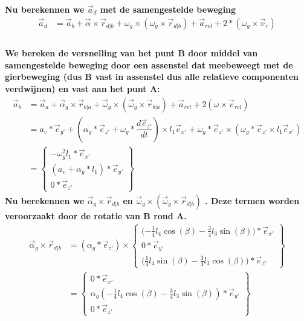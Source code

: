 \documentclass[a4paper,10pt]{article}
\begin{document}
\textbf{Nu berekennen we $\vec{a}_d$ met de samengestelde beweging}\\
\begin{equation}
	\begin{aligned}
		\vec{a}_d &= \vec{a}_b + \vec{\alpha} \times  \vec{r}_{d|b} + \omega_g \times (\omega_g \times \vec{r}_{d|b}) + \vec{a}_{rel} + 2* (\omega_g \times \vec{v}_r)\\
	\end{aligned}
\end{equation}
\\
\textbf{We bereken de versnelling van het punt B door middel van samengestelde beweging door een assenstel dat meebeweegt met de gierbeweging (dus B vast in assenstel dus alle relatieve componenten verdwijnen) en vast aan het punt A: }\\
\begin{equation}
\begin{aligned}
\vec{a}_b &= \vec{a}_a + \vec{\alpha}_g  \times \vec{r}_{b|a} + \vec{\omega}_g \times (\vec{\omega}_g \times \vec{r}_{b|a}) + \vec{a}_{rel} + 2(\omega \times \vec{v}_{rel})\\
&= a_v * \vec{e}_{y'} + (\alpha_g * \vec{e}_{z'} + \omega_g *\dfrac{d\vec{e}_{z'}}{dt}) \times l_1 \vec{e}_{x'} + \omega_{g} *\vec{e}_{z'} \times (\omega_{g} *\vec{e}_{z'}  \times l_1 \vec{e}_{x'})\\
& = \begin{Bmatrix}
-\omega^{2}_g l_1 * \vec{e}_{x'}\\
(a_v + \alpha_g * l_1)*\vec{e}_{y'}\\
0 * \vec{e}_{z'}
\end{Bmatrix}
\end{aligned}
\end{equation}
\textbf{Nu berekennen we $\vec{\alpha}_g \times \vec{r}_{d|b}$ en $\vec{\omega}_g \times (\vec{\omega}_g \times \vec{r}_{d|b})$ . Deze termen worden veroorzaakt door de rotatie van B rond A. }
\begin{equation}
\begin{aligned}
	\vec{\alpha}_g \times \vec{r}_{d|b}  &= (\alpha_g * \vec{e}_{z'}) \times \begin{Bmatrix}
	\Big({-\frac{1}{4}} l_4 \cos(\beta)-\frac{3}{4} l_3 \sin(\beta)\Big)*\vec{e}_{x'}\\
	0 * \vec{e}_{y'}\\
	\Big (\frac{1}{4} l_4 \sin(\beta) - \frac{3}{4} l_3 \cos(\beta)\Big) * \vec{e}_{z'}
	\end{Bmatrix}\\
	&= \begin{Bmatrix}
	0*\vec{e}_{x'}\\
	\alpha_g ({-\frac{1}{4}} l_4 \cos(\beta)-\frac{3}{4} l_3 \sin(\beta))*\vec{e}_{y'}\\
	0*\vec{e}_{z'}
	\end{Bmatrix}
\end{aligned}
\end{equation}
\end{document}
